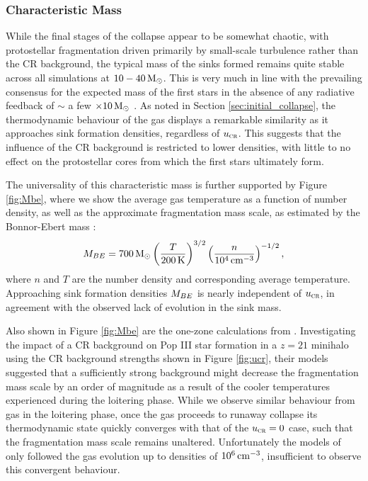 \documentclass[../thesis.tex]{subfiles}
\begin{document}
\subsubsection{Characteristic Mass}

While the final stages of the collapse appear to be somewhat chaotic, with protostellar fragmentation driven primarily by small-scale turbulence rather than the CR background, the typical mass of the sinks formed remains quite stable across all simulations at $10-40\,\mathrm{M}_{\odot}$.
This is very much in line with the prevailing consensus for the expected mass of the first stars in the absence of any radiative feedback of $\sim$ a few $\times10\,\mathrm{M}_{\odot}$ \citep{Bromm2013}.  
As noted in Section \ref{sec:initial_collapse}, the thermodynamic behaviour of the gas displays a remarkable similarity as it approaches sink formation densities, regardless of ${u}_{\textsc{cr}}$.
This suggests that the influence of the CR background is restricted to lower densities, with little to no effect on the protostellar cores from which the first stars ultimately form.

The universality of this characteristic mass is further supported by Figure \ref{fig:Mbe}, where we show the average gas temperature as a function of number density, as well as the approximate fragmentation mass scale, as estimated by the Bonnor-Ebert mass \citep[e.g.,][]{StacyBromm2007}:
\begin{equation}
    M_{\mathrm \small BE} = 700\,\mathrm{M}_{\odot} \left(\frac{T}{200\,\mathrm{K}}\right)^{3/2}
                                 \left(\frac{n}{10^4\,\mathrm{cm}^{-3}}   \right)^{-1/2},
\end{equation}
where $n$ and $T$ are the number density and corresponding average temperature.
Approaching sink formation densities $M_{\mathrm \small BE}$ is nearly independent of ${u}_{\textsc{cr}}$, in agreement with the observed lack of evolution in the sink mass.

Also shown in Figure \ref{fig:Mbe} are the one-zone calculations from \citet{StacyBromm2007}.
Investigating the impact of a CR background on Pop III star formation in a $z=21$ minihalo using the CR background strengths shown in Figure \ref{fig:ucr}, their models suggested 
that a sufficiently strong background might decrease the fragmentation mass scale by an order of magnitude as a result of the cooler temperatures experienced during the loitering phase.
While we observe similar behaviour from gas in the loitering phase, once the gas proceeds to runaway collapse its thermodynamic state quickly converges with that of the ${u}_{\textsc{cr}}=0$ case, such that the fragmentation mass scale remains unaltered.
Unfortunately the models of \citet{StacyBromm2007} only followed the gas evolution up to densities of $10^6\,\mathrm{cm}^{-3}$, insufficient to observe this convergent behaviour.
\end{document}
